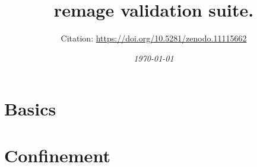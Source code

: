 \documentclass[a4paper,12pt]{article}
\title{{\Large \bf remage validation suite.}}
\author{{\normalsize Citation: \url{https://doi.org/10.5281/zenodo.11115662}}}
\date{{\it\normalsize \today}}  %
\begin{document}
\maketitle

\section{Basics}


\section{Confinement}

\end{document}
